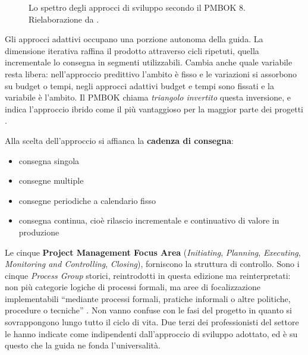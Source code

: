 \begin{figure}[htbp]
\centering
{}
\caption{Lo spettro degli approcci di sviluppo secondo il PMBOK 8. Rielaborazione da \cite{pmbok8}.}
\label{fig:pmbok-spettro}
\end{figure}
\newpage

Gli approcci adattivi occupano una porzione autonoma della guida. La dimensione
iterativa raffina il prodotto attraverso cicli ripetuti, quella incrementale lo
consegna in segmenti utilizzabili. Cambia anche quale variabile resta libera:
nell'approccio predittivo l'ambito \`e fisso e le variazioni si assorbono su
budget o tempi, negli approcci adattivi budget e tempi sono fissati e la
variabile \`e l'ambito. Il PMBOK chiama \emph{triangolo invertito} questa
inversione, e indica l'approccio ibrido come il pi\`u vantaggioso per la
maggior parte dei progetti \cite{pmbok8}.

Alla scelta dell'approccio si affianca la \textbf{cadenza di consegna}:
\begin {itemize}
\item consegna singola
\item consegne multiple
\item consegne periodiche a calendario fisso
\item consegna continua, cio\`e rilascio incrementale e continuativo di valore
in produzione
\end {itemize}

Le cinque \textbf{Project Management Focus Area} (\emph{Initiating},
\emph{Planning}, \emph{Executing}, \emph{Monitoring and Controlling},
\emph{Closing}), forniscono la struttura di controllo. Sono i cinque
\emph{Process Group} storici, reintrodotti in questa edizione ma reinterpretati:
non pi\`u categorie logiche di processi formali, ma aree di focalizzazione
implementabili ``mediante processi formali, pratiche informali o altre
politiche, procedure o tecniche'' \cite{pmbok8}. Non vanno confuse con le fasi
del progetto in quanto si sovrappongono lungo tutto il
ciclo di vita. Due terzi dei professionisti del settore le hanno
indicate come indipendenti dall'approccio di sviluppo adottato, ed \`e su questo
che la guida ne fonda l'universalit\`a.


